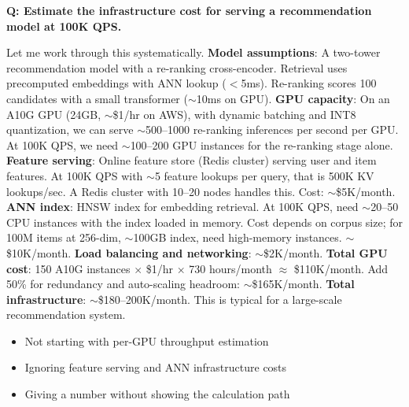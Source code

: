 \begin{interviewq}
\end{interviewq}

\begin{interviewq}
\textbf{Q: Estimate the infrastructure cost for serving a recommendation model at 100K QPS.}

 \quad {} \quad \badgefreq{\freqmed}

\stronganswer Let me work through this systematically. \textbf{Model assumptions}: A two-tower recommendation model with a re-ranking cross-encoder. Retrieval uses precomputed embeddings with ANN lookup ($<$5ms). Re-ranking scores 100 candidates with a small transformer ($\sim$10ms on GPU). \textbf{GPU capacity}: On an A10G GPU (24GB, $\sim$\$1/hr on AWS), with dynamic batching and INT8 quantization, we can serve $\sim$500--1000 re-ranking inferences per second per GPU. At 100K QPS, we need $\sim$100--200 GPU instances for the re-ranking stage alone. \textbf{Feature serving}: Online feature store (Redis cluster) serving user and item features. At 100K QPS with $\sim$5 feature lookups per query, that is 500K KV lookups/sec. A Redis cluster with 10--20 nodes handles this. Cost: $\sim$\$5K/month. \textbf{ANN index}: HNSW index for embedding retrieval. At 100K QPS, need $\sim$20--50 CPU instances with the index loaded in memory. Cost depends on corpus size; for 100M items at 256-dim, $\sim$100GB index, need high-memory instances. $\sim$\$10K/month. \textbf{Load balancing and networking}: $\sim$\$2K/month. \textbf{Total GPU cost}: 150 A10G instances $\times$ \$1/hr $\times$ 730 hours/month $\approx$ \$110K/month. Add 50\% for redundancy and auto-scaling headroom: $\sim$\$165K/month. \textbf{Total infrastructure}: $\sim$\$180--200K/month. This is typical for a large-scale recommendation system.

\redflags
\begin{itemize}
    \item Not starting with per-GPU throughput estimation
    \item Ignoring feature serving and ANN infrastructure costs
    \item Giving a number without showing the calculation path
\end{itemize}



\end{interviewq}
